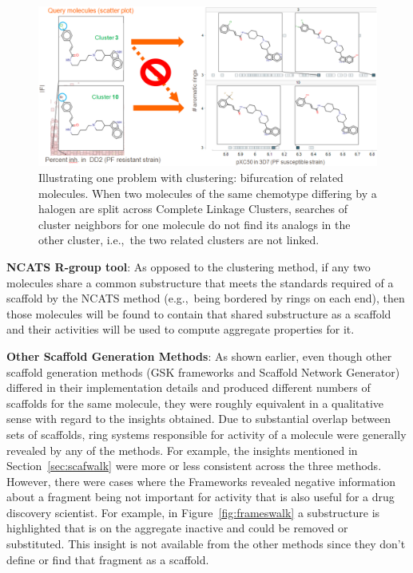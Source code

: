 \documentclass[journal=jacsat,manuscript=article]{achemso}
\newcommand*\fref[1]{Figure~\ref{fig:#1}}
\newcommand*\sref[1]{Section~\ref{sec:#1}}
\newcommand*\eg{e.g.,~}
\newcommand*\ie{i.e.,~}
\begin{document}
\begin{figure}
\includegraphics[width=6in]{fig/clusterlanes.png}
\caption{Illustrating one problem with clustering: bifurcation of related molecules.  When two molecules of the same chemotype differing by a halogen are split across Complete Linkage Clusters, searches of cluster neighbors for one molecule do not find its analogs in the other cluster, \ie the two related clusters are not linked.}
\label{fig:clusterlanes}
\end{figure}



{\bf NCATS R-group tool}: As opposed to the clustering method, 
if any two molecules share a common substructure that meets the standards required of a scaffold by the NCATS method (\eg being bordered by rings on each end), then those molecules will be found to contain that shared substructure as a scaffold and their activities will be used to compute aggregate properties for it. 

{\bf Other Scaffold Generation Methods}: As shown earlier, even though other scaffold generation methods (GSK frameworks and Scaffold Network Generator) differed in their implementation details and produced different numbers of scaffolds for the same molecule, they were roughly equivalent in a qualitative sense with regard to the insights obtained. Due to substantial overlap between sets of scaffolds, ring systems responsible for activity of a molecule were generally revealed by any of the methods. For example, the insights mentioned in \sref{scafwalk} were more or less consistent across the three methods. However, there were cases where the Frameworks revealed negative information about a fragment being not important for activity that is also useful for a drug discovery scientist. For example, in \fref{frameswalk} a substructure is highlighted that is on the aggregate inactive and could be removed or substituted. This insight is not available from the other methods since they don't define or find that fragment as a scaffold.
\end{document}
